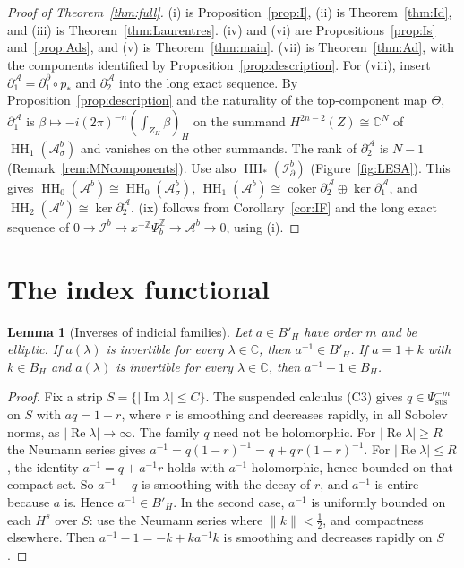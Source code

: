 \documentclass[11pt,oneside,reqno]{article}
\DeclareMathOperator{\HH}{HH}
\newcommand{\C}{\mathbb C}
\newcommand{\Z}{\mathbb Z}
\newcommand{\Ib}{\mathcal I^b}
\newcommand{\Idb}{\mathcal I^b_\partial}
\newcommand{\Ab}{\mathcal A^b}
\newcommand{\Asb}{\mathcal A^b_\sigma}
\theoremstyle{plain}
\newtheorem{lemma}[theorem]{Lemma}
\theoremstyle{definition}
\theoremstyle{remark}
\begin{document}
\begin{proof}[Proof of Theorem~\textup{\ref{thm:full}}]
(i) is Proposition~\ref{prop:I}, (ii) is Theorem~\ref{thm:Id}, and (iii) is
Theorem~\ref{thm:Laurentres}. (iv) and (vi) are
Propositions~\ref{prop:Is} and~\ref{prop:Ads}, and (v) is
Theorem~\ref{thm:main}. (vii) is Theorem~\ref{thm:Ad}, with the components
identified by Proposition~\ref{prop:description}. For (viii), insert
\(\partial^{\mathcal A}_1=\partial^\partial_1\circ p_*\) and
\(\partial^{\mathcal A}_2\) into the long exact sequence. By
Proposition~\ref{prop:description} and the naturality of the top-component
map \(\Theta\), \(\partial^{\mathcal A}_1\) is
\(\beta\mapsto-i(2\pi)^{-n}(\int_{Z_H}\beta)_H\) on the summand
\(H^{2n-2}(Z)\cong\C^N\) of \(\HH_1(\Asb)\) and vanishes on the other
summands. The rank of \(\partial^{\mathcal A}_2\) is \(N-1\)
(Remark~\ref{rem:MNcomponents}). Use also \(\HH_*(\Idb)\)
(Figure~\ref{fig:LESA}). This gives \(\HH_0(\Ab)\cong\HH_0(\Asb)\),
\(\HH_1(\Ab)\cong\operatorname{coker}\partial^{\mathcal A}_2\oplus
\ker\partial^{\mathcal A}_1\), and \(\HH_2(\Ab)\cong\ker\partial^{\mathcal
A}_2\). (ix) follows from Corollary~\ref{cor:IF} and the long exact
sequence of \(0\to\Ib\to x^{-\Z}\Psi_b^{\Z}\to\Ab\to0\), using (i).
\end{proof}

\section{The index functional}\label{sec:index}

\begin{lemma}[Inverses of indicial families]\label{lem:autoinv}
Let \(a\in B'_H\) have order \(m\) and be elliptic. If \(a(\lambda)\) is
invertible for every \(\lambda\in\C\), then \(a^{-1}\in B'_H\). If
\(a=1+k\) with \(k\in B_H\) and \(a(\lambda)\) is invertible for every
\(\lambda\in\C\), then \(a^{-1}-1\in B_H\).
\end{lemma}

\begin{proof}
Fix a strip \(S=\{|\operatorname{Im}\lambda|\leq C\}\). The suspended
calculus (C3) gives \(q\in\Psi^{-m}_{\mathrm{sus}}\) on \(S\) with
\(aq=1-r\), where \(r\) is smoothing and decreases rapidly, in all
Sobolev norms, as \(|\operatorname{Re}\lambda|\to\infty\). The family
\(q\) need not be holomorphic. For \(|\operatorname{Re}\lambda|\geq R\)
the Neumann series gives \(a^{-1}=q(1-r)^{-1}=q+q\,r(1-r)^{-1}\). For
\(|\operatorname{Re}\lambda|\leq R\), the identity \(a^{-1}=q+a^{-1}r\)
holds with \(a^{-1}\) holomorphic, hence bounded on that compact set. So
\(a^{-1}-q\) is smoothing with the decay of \(r\), and \(a^{-1}\) is entire
because \(a\) is. Hence \(a^{-1}\in B'_H\). In the second case, \(a^{-1}\)
is uniformly bounded on each \(H^s\) over \(S\): use the Neumann series
where \(\|k\|<\tfrac12\), and compactness elsewhere. Then
\(a^{-1}-1=-k+ka^{-1}k\) is smoothing and decreases rapidly on \(S\).
\end{proof}
\end{document}
